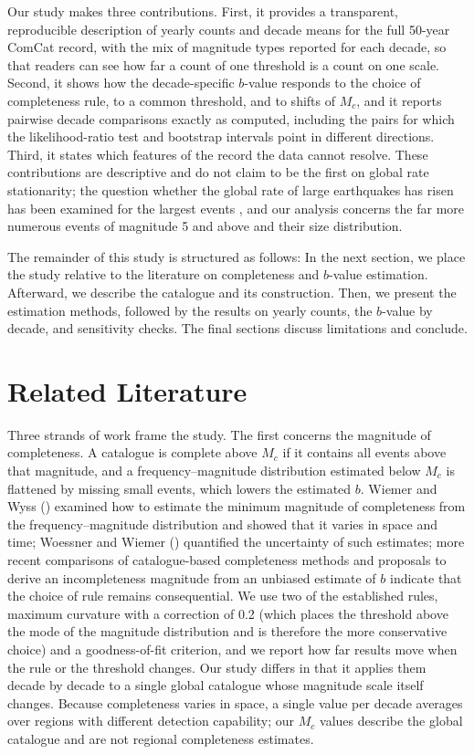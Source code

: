 \documentclass[11pt]{article}
\begin{document}
Our study makes three contributions. First, it provides a transparent, reproducible description of yearly counts and decade means for the full 50-year ComCat record, with the mix of magnitude types reported for each decade, so that readers can see how far a count of one threshold is a count on one scale. Second, it shows how the decade-specific $b$-value responds to the choice of completeness rule, to a common threshold, and to shifts of $M_c$, and it reports pairwise decade comparisons exactly as computed, including the pairs for which the likelihood-ratio test and bootstrap intervals point in different directions. Third, it states which features of the record the data cannot resolve. These contributions are descriptive and do not claim to be the first on global rate stationarity; the question whether the global rate of large earthquakes has risen has been examined for the largest events \citep{shearer2011global}, and our analysis concerns the far more numerous events of magnitude 5 and above and their size distribution.

The remainder of this study is structured as follows: In the next section, we place the study relative to the literature on completeness and $b$-value estimation. Afterward, we describe the catalogue and its construction. Then, we present the estimation methods, followed by the results on yearly counts, the $b$-value by decade, and sensitivity checks. The final sections discuss limitations and conclude.

\section{Related Literature}

Three strands of work frame the study. The first concerns the magnitude of completeness. A catalogue is complete above $M_c$ if it contains all events above that magnitude, and a frequency--magnitude distribution estimated below $M_c$ is flattened by missing small events, which lowers the estimated $b$. Wiemer and Wyss (\citeyear{wiemer2000minimum}) examined how to estimate the minimum magnitude of completeness from the frequency--magnitude distribution and showed that it varies in space and time; Woessner and Wiemer (\citeyear{woessner2005assessing}) quantified the uncertainty of such estimates; more recent comparisons of catalogue-based completeness methods \citep{wang2025estimating} and proposals to derive an incompleteness magnitude from an unbiased estimate of $b$ \citep{godano2023evaluating} indicate that the choice of rule remains consequential. We use two of the established rules, maximum curvature with a correction of 0.2 (which places the threshold above the mode of the magnitude distribution and is therefore the more conservative choice) and a goodness-of-fit criterion, and we report how far results move when the rule or the threshold changes. Our study differs in that it applies them decade by decade to a single global catalogue whose magnitude scale itself changes. Because completeness varies in space, a single value per decade averages over regions with different detection capability; our $M_c$ values describe the global catalogue and are not regional completeness estimates.
\end{document}
